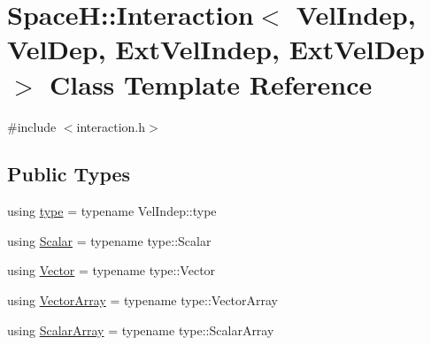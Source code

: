 \hypertarget{class_space_h_1_1_interaction}{}\section{SpaceH\+:\+:Interaction$<$ Vel\+Indep, Vel\+Dep, Ext\+Vel\+Indep, Ext\+Vel\+Dep $>$ Class Template Reference}
\label{class_space_h_1_1_interaction}


{\ttfamily \#include $<$interaction.\+h$>$}

\subsection*{Public Types}
\begin{DoxyCompactItemize}
\item 
using \mbox{\hyperlink{class_space_h_1_1_interaction_a0bed18b8b8efcb42be264a255f931be6}{type}} = typename Vel\+Indep\+::type
\item 
using \mbox{\hyperlink{class_space_h_1_1_interaction_a6ff49274a9233d682fdd75b70ac4d9dc}{Scalar}} = typename type\+::\+Scalar
\item 
using \mbox{\hyperlink{class_space_h_1_1_interaction_ad6d656d30b9272a5f690b0412a4a9a86}{Vector}} = typename type\+::\+Vector
\item 
using \mbox{\hyperlink{class_space_h_1_1_interaction_a9aaccf9a34d875881d9448acf7aaf009}{Vector\+Array}} = typename type\+::\+Vector\+Array
\item 
using \mbox{\hyperlink{class_space_h_1_1_interaction_af9db1e366eeabfcd2dcea3e4343e3f57}{Scalar\+Array}} = typename type\+::\+Scalar\+Array
\end{DoxyCompactItemize}
